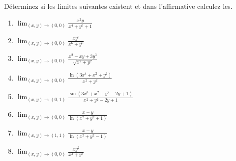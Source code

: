 
\begin{exercice}\label{exo0028}

Déterminez si les limites suivantes existent et dans l'affirmative calculez les.
%
%
\begin{multicols}{2}
\begin{enumerate}
	\item $ \lim_{(x,y) \rightarrow (0,0)} \frac{x^2y}{x^4+y^6+1} $
	\item $ \lim_{(x,y) \rightarrow (0,0)} \frac{xy^5}{x^6+y^6} $
	\item $ \lim_{(x,y) \rightarrow (0,0)} \frac{x^2-xy + 3y^3}{\sqrt{x^2+ y^2}} $
	\item $\lim_{(x,y) \rightarrow (0,0)} \frac{\ln(3x^4 + x^2 + y^2)}{x^2 + y^2} $
	\item\label{Item0028e} $\lim_{(x,y) \rightarrow (0,1)} \frac{\sin(3x^3 + x^2 + y^2 -2y +1)}{x^2 + y^2- 2y +1} $
	\item $ \lim_{(x,y) \rightarrow (0,0)} \frac{x - y}{\ln(x^2 + y^2 + 1)} $
	\item $ \lim_{(x,y) \rightarrow (1,1)} \frac{x - y}{\ln(x^2 + y^2 - 1)} $
	\item $ \lim_{(x,y) \rightarrow (0,0)} \frac{xy^2}{x^2+y^4} $
\end{enumerate}
\end{multicols}

\end{exercice}
